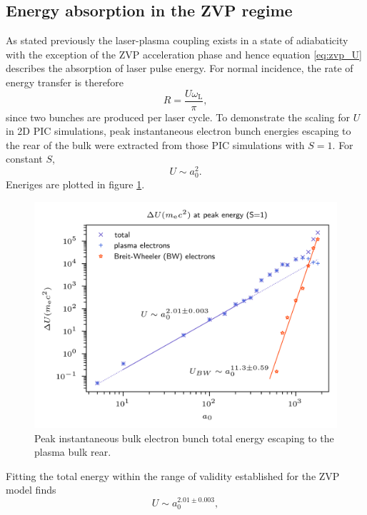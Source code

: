 \subsection{Energy absorption in the ZVP regime}\label{sec:zvp-energyabsorption}
As stated previously the laser-plasma coupling exists in a state of adiabaticity with the exception of the ZVP acceleration phase and hence equation \ref{eq:zvp_U} describes the absorption of laser pulse energy. For normal incidence, the rate of energy transfer is therefore
\begin{equation}\label{eq:zvp-rate}
	R = \frac{U\omega_\mathrm{L}}{\pi},
\end{equation}
since two bunches are produced per laser cycle. To demonstrate the scaling for $U$ in 2D PIC simulations, peak instantaneous electron bunch energies escaping to the rear of the bulk were extracted from those PIC simulations with $S=1$. For constant $S$, 
\begin{equation}
	U \sim a^2_0.
\end{equation}
Eneriges are plotted in figure \ref{fig:zvppeakgamma}.
\begin{figure}
	\centering
	\includegraphics[width=0.7\linewidth]{figures/zvp/zvp_peak_gamma}
	\caption[Peak instantaneous bulk electron bunch total energy escaping to the plasma bulk rear.]{Peak instantaneous bulk electron bunch total energy escaping to the plasma bulk rear.}
	\label{fig:zvppeakgamma}
\end{figure}
Fitting the total energy within the range of validity established for the ZVP model finds
\begin{equation}
	U \sim a^{2.01\pm0.003}_0,
\end{equation}
